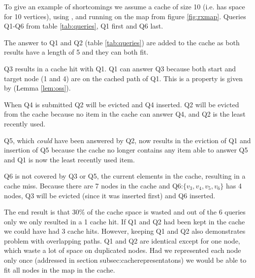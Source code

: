 



To give an example of \lrus shortcomings we assume a cache of size 10 (i.e. has space for 10 vertices), using \lruns, and running on the map from figure \ref{fig:rxmap}. Queries Q1-Q6 from table \ref{tab:queries}, Q1 first and Q6 last.

The answer to Q1 and Q2 (table \ref{tab:queries}) are added to the cache as both results have a length of 5 and they can both fit. 

Q3 results in a cache hit with Q1. Q1 can answer Q3 because both start and target node (1 and 4) are on the cached path of Q1. This is a property is given by \oss (Lemma \ref{lem:oss}).

When Q4 is submitted Q2 will be evicted and Q4 inserted. Q2 will be evicted from the cache because no item in the cache can answer Q4, and Q2 is the least recently used.

Q5, which \textit{could} have been answered by Q2, now results in the eviction of Q1 and insertion of Q5 because the cache no longer contains any item able to answer Q5 and Q1 is now the least recently used item.

Q6 is not covered by Q3 or Q5, the current elements in the cache, resulting in a cache miss. Because there are 7 nodes in the cache and Q6:$\{v_3,v_4,v_5,v_6\}$ has 4 nodes, Q3 will be evicted (since it was inserted first) and Q6 inserted. 

The end result is that 30\% of the cache space is wasted and out of the 6 queries only we only resulted in a 1 cache hit. If Q1 and Q2 had been kept in the cache we could have had 3 cache hits. However, keeping Q1 and Q2 also  demonstrates \lrus problem with overlapping paths. Q1 and Q2 are identical except for one node, which waste a lot of space on duplicated nodes. Had we represented each node only once (addressed in section {subsec:cacherepresentatons}) we would be able to fit all nodes in the map in the cache.






